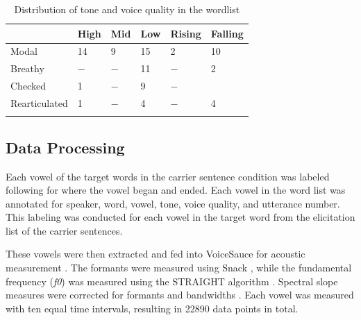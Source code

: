 \begin{table}[!h]
  \centering
  \caption{Distribution of tone and voice quality in the wordlist}
  \label{tab:distribution}
    \begin{tabular}{llllll}
    \lsptoprule
    & High & Mid & Low & Rising & Falling\\
    \hline
    Modal & 14 & 9 & 15 & 2 & 10 \\
    Breathy & $-$ & $-$ & 11 & $-$ & 2 \\
    Checked & 1 & $-$ & 9 & $-$ & \\
    Rearticulated & 1 & $-$ & 4 & $-$ & 4 \\
    \lspbottomrule
    \end{tabular}
\end{table}


\subsection{Data Processing} \label{sec:DataProcessing}

Each vowel of the target words in the carrier sentence condition was labeled following \citet{garellekAcousticDiscriminabilityComplex2020} for where the vowel began and ended. Each vowel in the word list was annotated for speaker, word, vowel, tone, voice quality, and utterance number. This labeling was conducted for each vowel in the target word from the elicitation list of the carrier sentences.

These vowels were then extracted and fed into VoiceSauce for acoustic measurement \citep{shueVoiceSauceProgramVoice2011}. The formants were measured using Snack \citep{sjolanderSnackSoundToolkit2004}, while the fundamental frequency (\textit{f0}) was measured using the STRAIGHT algorithm \citep{kawaharaInstantaneousfrequencybasedPitchExtraction1998}. Spectral slope measures were corrected for formants and bandwidths \citep{hansonGlottalCharacteristicsFemale1997,iseliAgeSexVowel2007}. Each vowel was measured with ten equal time intervals, resulting in 22890 data points in total.

